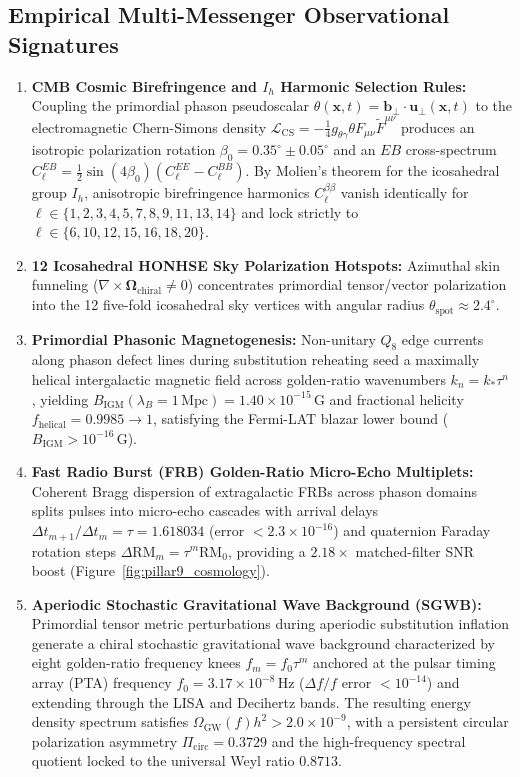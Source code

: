\documentclass[11pt,a4paper]{article}
\theoremstyle{definition}
\begin{document}
\subsection{Empirical Multi-Messenger Observational Signatures}
\begin{enumerate}
    \item \textbf{CMB Cosmic Birefringence and $I_h$ Harmonic Selection Rules:} Coupling the primordial phason pseudoscalar $\theta(\mathbf{x},t) = \mathbf{b}_\perp \cdot \mathbf{u}_\perp(\mathbf{x},t)$ to the electromagnetic Chern-Simons density $\mathcal{L}_{\mathrm{CS}} = -\frac{1}{4}g_{\theta\gamma}\theta F_{\mu\nu}\tilde{F}^{\mu\nu}$ produces an isotropic polarization rotation $\beta_0 = 0.35^\circ \pm 0.05^\circ$ \cite{MinamiKomatsu2020} and an $EB$ cross-spectrum $C_\ell^{EB} = \frac{1}{2}\sin(4\beta_0)(C_\ell^{EE}-C_\ell^{BB})$. By Molien's theorem for the icosahedral group $I_h$, anisotropic birefringence harmonics $C_\ell^{\beta\beta}$ vanish identically for $\ell \in \{1,2,3,4,5,7,8,9,11,13,14\}$ and lock strictly to $\ell \in \{6,10,12,15,16,18,20\}$.
    \item \textbf{12 Icosahedral HONHSE Sky Polarization Hotspots:} Azimuthal skin funneling ($\nabla \times \boldsymbol{\Omega}_{\mathrm{chiral}} \neq 0$) concentrates primordial tensor/vector polarization into the 12 five-fold icosahedral sky vertices with angular radius $\theta_{\mathrm{spot}} \approx 2.4^\circ$.
    \item \textbf{Primordial Phasonic Magnetogenesis:} Non-unitary $Q_8$ edge currents along phason defect lines during substitution reheating seed a maximally helical intergalactic magnetic field across golden-ratio wavenumbers $k_n = k_* \tau^n$, yielding $B_{\mathrm{IGM}}(\lambda_B = 1\,\mathrm{Mpc}) = 1.40 \times 10^{-15}\,\mathrm{G}$ and fractional helicity $f_{\mathrm{helical}} = 0.9985 \to 1$, satisfying the Fermi-LAT blazar lower bound ($B_{\mathrm{IGM}} > 10^{-16}\,\mathrm{G}$).
    \item \textbf{Fast Radio Burst (FRB) Golden-Ratio Micro-Echo Multiplets:} Coherent Bragg dispersion of extragalactic FRBs across phason domains splits pulses into micro-echo cascades with arrival delays $\Delta t_{m+1}/\Delta t_m = \tau = 1.618034$ (error $< 2.3 \times 10^{-16}$) and quaternion Faraday rotation steps $\Delta\mathrm{RM}_m = \tau^m \mathrm{RM}_0$, providing a $2.18\times$ matched-filter SNR boost (Figure~\ref{fig:pillar9_cosmology}).
    \item \textbf{Aperiodic Stochastic Gravitational Wave Background (SGWB):} Primordial tensor metric perturbations during aperiodic substitution inflation generate a chiral stochastic gravitational wave background characterized by eight golden-ratio frequency knees $f_m = f_0 \tau^m$ anchored at the pulsar timing array (PTA) frequency $f_0 = 3.17 \times 10^{-8}\,\mathrm{Hz}$ ($\Delta f / f$ error $< 10^{-14}$) and extending through the LISA and Decihertz bands. The resulting energy density spectrum satisfies $\Omega_{\mathrm{GW}}(f)h^2 > 2.0 \times 10^{-9}$, with a persistent circular polarization asymmetry $\Pi_{\mathrm{circ}} = 0.3729$ and the high-frequency spectral quotient locked to the universal Weyl ratio $0.8713$.

\end{enumerate}
\end{document}
